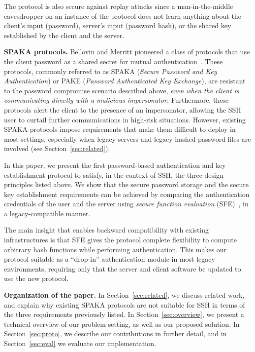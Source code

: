 The protocol is also secure against replay attacks since a
man-in-the-middle eavesdropper on an instance of the protocol does not
learn anything about the client's input (password), server's input
(password hash), or the shared key established by the client and
the server.



\vspace{1ex}
\noindent
\textbf{SPAKA protocols.}  Bellovin and Merritt pioneered a class of
protocols that use the client password as a shared secret for mutual
authentication~\cite{bellovin92}. These protocols, commonly referred
to as SPAKA (\emph{Secure Password and Key Authentication}) or PAKE
(\emph{Password Authenticated Key Exchange}), are resistant to the
password compromise scenario described above, \emph{even when the
client is communicating directly with a malicious impersonator.}
Furthermore, these protocols alert the client to the presence of an
impersonator, allowing the SSH user to curtail further communications
in high-risk situations.  However, existing SPAKA protocols impose
requirements that make them difficult to deploy in most settings,
especially when legacy servers and legacy hashed-password files are
involved (see Section~\ref{sec:related}).

In this paper, we present the first password-based authentication and
key establishment protocol to satisfy, in the context of SSH, the
three design principles listed above.  We show that the secure
password storage and the secure key establishment requirements can be
achieved by comparing the authentication credentials of the user and
the server using \emph{secure function evaluation} (SFE)~\cite{yao82},
in a legacy-compatible manner.

The main insight that enables backward compatibility with existing
infrastructures is that SFE gives the protocol complete flexibility to
compute arbitrary hash functions while performing authentication.
This makes our protocol suitable as a ``drop-in'' authentication
module in most legacy environments, requiring only that the server and
client software be updated to use the new protocol.


\vspace{1ex}
\noindent
\textbf{Organization of the paper.}  In Section~\ref{sec:related}, we
discuss related work, and explain why existing SPAKA protocols are not
suitable for SSH in terms of the three requirements previously
listed. In Section~\ref{sec:overview}, we present a technical overview
of our problem setting, as well as our proposed solution. In
Section~\ref{sec:proto}, we describe our contributions in further
detail, and in Section~\ref{sec:eval} we evaluate our implementation.
